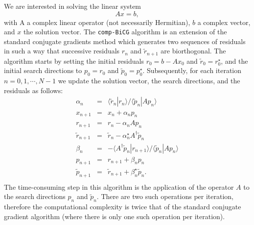 \documentclass[twocolumn,prb,showpacs,superscriptaddress]{revtex4}
\def\>{\rangle}
\def\<{\langle}
\def\rt{\tilde{r}}
\def\pt{\tilde{p}}
\begin{document}
We are interested in solving the linear system
  \begin{equation}\label{eq.axeqb}
  Ax=b,
  \end{equation}
with A a complex linear operator (not necessarily Hermitian), $b$ a complex 
vector, and $x$ the solution vector.
The {\tt comp-BiCG} algorithm is an extension of the standard conjugate
gradients method which generates two sequences of residuals in such a
way that successive residuals $r_n$ and $\rt_{n+1}$ are biorthogonal.\cite{jacobs}
The algorithm starts by setting the initial residuals
$r_0 = b-Ax_0$ and $\rt_0=r_0^\star$, and the initial search directions to 
$p_0=r_0$ and $\pt_0=p_0^\star$.
Subsequently, for each iteration $n=0,1,\cdots,N-1$ we update the solution
vector, the search directions, and the residuals as follows:
  \begin{eqnarray}
  \alpha_n & = & \<\rt_n|r_n\>/\<\pt_n|Ap_n\> \nonumber \\ \nonumber
  x_{n+1} & = & x_n + \alpha_n p_n \\ \nonumber
  r_{n+1} & = & r_n - \alpha_n Ap_n \\ \nonumber
  \rt_{n+1} & = & \rt_n - \alpha_n^\star A^\dagger \pt_n \\ \nonumber
  \beta_n & = & - \<A^\dagger\pt_n|r_{n+1}\>/\<\pt_n|Ap_n\> \\ \nonumber
  p_{n+1} & = & r_{n+1} + \beta_n p_n \\ \nonumber
  \pt_{n+1} & = & \rt_{n+1} + \beta_n^\star \pt_n. \\ \nonumber
  \end{eqnarray}
The time-consuming step in this algorithm is the application of the operator 
$A$ to the search directions $p_n$ and $\pt_n$. There are two such operations 
per iteration, therefore the computational complexity is twice that of the
standard conjugate gradient algorithm (where there is only one such operation
per iteration).
\end{document}
